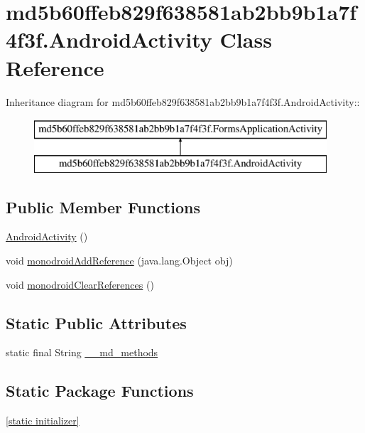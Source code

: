 \hypertarget{classmd5b60ffeb829f638581ab2bb9b1a7f4f3f_1_1_android_activity}{
\section{md5b60ffeb829f638581ab2bb9b1a7f4f3f.AndroidActivity Class Reference}
\label{classmd5b60ffeb829f638581ab2bb9b1a7f4f3f_1_1_android_activity}
}
Inheritance diagram for md5b60ffeb829f638581ab2bb9b1a7f4f3f.AndroidActivity::\begin{figure}[H]
\begin{center}
\leavevmode
\includegraphics[height=2cm]{classmd5b60ffeb829f638581ab2bb9b1a7f4f3f_1_1_android_activity}
\end{center}
\end{figure}
\subsection*{Public Member Functions}
\begin{CompactItemize}
\item 
\hyperlink{classmd5b60ffeb829f638581ab2bb9b1a7f4f3f_1_1_android_activity_d1caa81ed50416868d2c814badd75255}{AndroidActivity} ()
\item 
void \hyperlink{classmd5b60ffeb829f638581ab2bb9b1a7f4f3f_1_1_android_activity_6b88d0d1ad864a4599f8a26deaacb459}{monodroidAddReference} (java.lang.Object obj)
\item 
void \hyperlink{classmd5b60ffeb829f638581ab2bb9b1a7f4f3f_1_1_android_activity_5b7d4be6ba547abcf4a46221f65a8eb6}{monodroidClearReferences} ()
\end{CompactItemize}
\subsection*{Static Public Attributes}
\begin{CompactItemize}
\item 
static final String \hyperlink{classmd5b60ffeb829f638581ab2bb9b1a7f4f3f_1_1_android_activity_96cef65bd666995b23bcd03497dea337}{\_\-\_\-md\_\-methods}
\end{CompactItemize}
\subsection*{Static Package Functions}
\begin{CompactItemize}
\item 
\hyperlink{classmd5b60ffeb829f638581ab2bb9b1a7f4f3f_1_1_android_activity_ce19d2cda349014c97ed5589f26495f0}{\mbox{[}static initializer\mbox{]}}
\end{CompactItemize}
